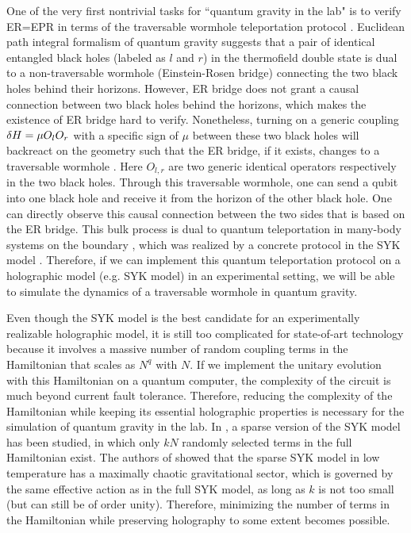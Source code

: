 \documentclass[11pt]{article}
\renewcommand{\>}{\rangle}
\newcommand{\<}{\langle}
\begin{document}
One of the very first nontrivial tasks for ``quantum gravity in the lab" is to verify ER=EPR \cite{Maldacena:2013xja} in terms of the traversable wormhole teleportation protocol \cite{Gao:2019nyj}. Euclidean path integral formalism of quantum gravity suggests that a pair of identical entangled black holes (labeled as $l$ and $r$) in the thermofield double state is dual to a non-traversable wormhole (Einstein-Rosen bridge) connecting the two black holes behind their horizons. However, ER bridge does not grant a causal connection between two black holes behind the horizons, which makes the existence of ER bridge hard to verify. Nonetheless, turning on a generic coupling $\delta H=\mu O_l O_r$ with a specific sign of $\mu$ between these two black holes will backreact on the geometry such that the ER bridge, if it exists, changes to a traversable wormhole \cite{Gao:2016bin}. Here $O_{l,r}$ are two generic identical operators respectively in the two black holes. Through this traversable wormhole, one can send a qubit into one black hole and receive it from the horizon of the other black hole. One can directly observe this causal connection between the two sides that is based on the ER bridge. This bulk process is dual to quantum teleportation in many-body systems on the boundary \cite{Gao:2016bin}, which was realized by a concrete protocol in the SYK model \cite{Gao:2019nyj}. Therefore, if we can implement this quantum teleportation protocol on a holographic model (e.g. SYK model) in an experimental setting, we will be able to simulate the dynamics of a traversable wormhole in quantum gravity.

Even though the SYK model is the best candidate for an experimentally realizable holographic model, it is still too complicated for state-of-art technology because it involves a massive number of random coupling terms in the Hamiltonian that scales as $N^q$ with $N$. If we implement the unitary evolution with this Hamiltonian on a quantum computer, the complexity of the circuit is much beyond current fault tolerance. Therefore, reducing the complexity of the Hamiltonian while keeping its essential holographic properties is necessary for the simulation of quantum gravity in the lab. In \cite{Xu:2020shn}, a sparse version of the SYK model has been studied, in which only $k N$ randomly selected terms in the full Hamiltonian exist. The authors of \cite{Xu:2020shn} showed that the sparse SYK model in low temperature has a maximally chaotic gravitational sector, which is governed by the same effective action as in the full SYK model, as long as $k$ is not too small (but can still be of order unity). Therefore, minimizing the number of terms in the Hamiltonian while preserving holography to some extent becomes possible.
\end{document}
